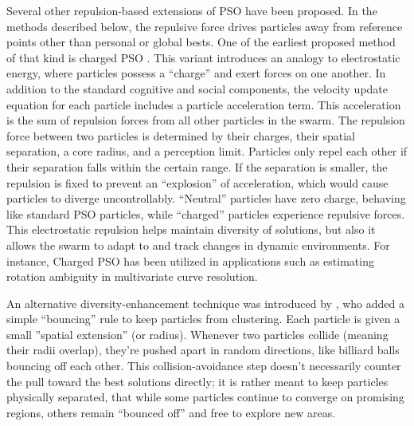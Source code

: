 {Several other repulsion-based extensions of PSO have been proposed. In the methods described below, the repulsive force drives particles away from reference points other than personal or global bests.  
One of the earliest proposed method of that kind is 
charged PSO \citep{blackwell2003swarms,blackwell2002collision,blackwell2002dynamic}. This variant introduces an analogy to electrostatic energy, where particles possess a ``charge'' and exert forces on one another. In addition to the standard cognitive and social components, the velocity update equation for each particle includes a particle acceleration term. This acceleration is the sum of repulsion forces from all other particles in the swarm. The repulsion force between two particles is determined by their charges, their spatial separation, a core radius, and a perception limit. Particles only repel each other if their separation falls within the certain range. If the separation is smaller, the repulsion is fixed to prevent an ``explosion'' of acceleration, which would cause particles to diverge uncontrollably. ``Neutral'' particles have zero charge, behaving like standard PSO particles, while ``charged'' particles experience repulsive forces. This electrostatic repulsion helps maintain diversity of solutions, but also it allows the swarm to adapt to and track changes in dynamic environments. For instance, Charged PSO has been utilized in applications such as estimating rotation ambiguity in multivariate curve resolution.

An alternative diversity-enhancement technique was introduced by \citet{krink2002spatial}, who 
added a simple ``bouncing'' rule to keep particles from clustering. Each particle is given a small ''spatial extension'' (or radius). Whenever two particles collide  (meaning their radii overlap), they're pushed apart in random directions, like billiard balls bouncing off each other. This collision-avoidance step doesn’t necessarily counter the pull toward the best solutions directly; it is rather meant to keep particles physically separated, that while some particles continue to converge on promising regions, others remain ``bounced off'' and free to explore new areas.

}
